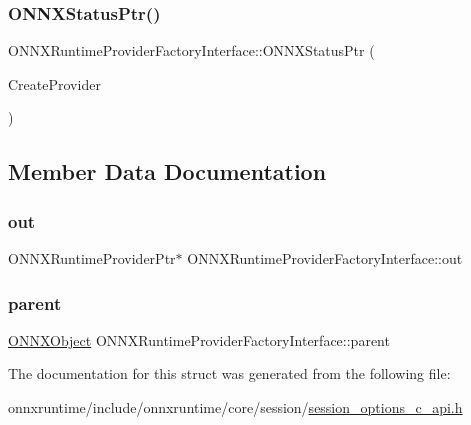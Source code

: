 \subsubsection{\texorpdfstring{O\+N\+N\+X\+Status\+Ptr()}{ONNXStatusPtr()}}
{\footnotesize\ttfamily O\+N\+N\+X\+Runtime\+Provider\+Factory\+Interface\+::\+O\+N\+N\+X\+Status\+Ptr (\begin{DoxyParamCaption}\item[{\mbox{\hyperlink{error__code_8h_aeaeecdc9b792735c3e26fc0f9815c988}{O\+N\+N\+X\+R\+U\+N\+T\+I\+M\+E\+\_\+\+A\+P\+I\+\_\+\+S\+T\+A\+T\+U\+S\+C\+A\+LL}} $\ast$}]{Create\+Provider }\end{DoxyParamCaption})}



\subsection{Member Data Documentation}
\mbox{\label{structONNXRuntimeProviderFactoryInterface_a09496ffe23137d4dc2a2b017282b91c9}} 
\subsubsection{\texorpdfstring{out}{out}}
{\footnotesize\ttfamily O\+N\+N\+X\+Runtime\+Provider\+Ptr$\ast$ O\+N\+N\+X\+Runtime\+Provider\+Factory\+Interface\+::out}

\mbox{\label{structONNXRuntimeProviderFactoryInterface_abd899afd61a75b368085193024136053}} 
\subsubsection{\texorpdfstring{parent}{parent}}
{\footnotesize\ttfamily \mbox{\hyperlink{structONNXObject}{O\+N\+N\+X\+Object}} O\+N\+N\+X\+Runtime\+Provider\+Factory\+Interface\+::parent}



The documentation for this struct was generated from the following file\+:\begin{DoxyCompactItemize}
\item 
onnxruntime/include/onnxruntime/core/session/\mbox{\hyperlink{session__options__c__api_8h}{session\+\_\+options\+\_\+c\+\_\+api.\+h}}\end{DoxyCompactItemize}
